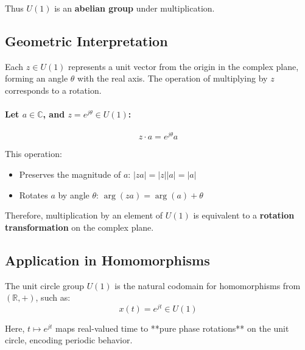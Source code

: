 \documentclass[12pt]{article}
\begin{document}
	Thus \( U(1) \) is an \textbf{abelian group} under multiplication.
	
	\subsection*{Geometric Interpretation}
	
	Each \( z \in U(1) \) represents a unit vector from the origin in the complex plane, forming an angle \( \theta \) with the real axis. The operation of multiplying by \( z \) corresponds to a rotation.
	
	\paragraph{Let \( a \in \mathbb{C} \), and \( z = e^{j\theta} \in U(1) \):}
	\[
	z \cdot a = e^{j\theta} a
	\]
	
	This operation:
	\begin{itemize}
		\item Preserves the magnitude of \( a \): \( |z a| = |z||a| = |a| \)
		\item Rotates \( a \) by angle \( \theta \): \( \arg(z a) = \arg(a) + \theta \)
	\end{itemize}
	
	Therefore, multiplication by an element of \( U(1) \) is equivalent to a \textbf{rotation transformation} on the complex plane.
	
	\subsection*{Application in Homomorphisms}
	
	The unit circle group \( U(1) \) is the natural codomain for homomorphisms from \( (\mathbb{R}, +) \), such as:
	\[
	x(t) = e^{j t} \in U(1)
	\]
	
	Here, \( t \mapsto e^{j t} \) maps real-valued time to **pure phase rotations** on the unit circle, encoding periodic behavior.
	
	
	
	
\end{document}
